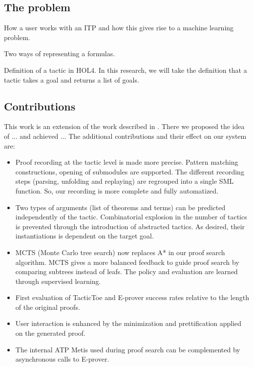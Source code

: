 \documentclass[runningheads,a4paper,draft]{svjour3}
\newcommand{\todoi}[1]{\todo[inline]{#1}}
\def\holfour{\textsf{HOL4}\xspace}
\def\eprover{\textsf{E-prover}\xspace}
\def\sml{\textsf{SML}\xspace}
\def\metis{\textsf{Metis}\xspace}
\def\tactictoe{\textsf{TacticToe}\xspace}
\begin{document}
\subsection{The problem}\todo{}

How a user works with an ITP and how this gives rise to a machine learning problem.

Two ways of representing a formulas.

Definition of a tactic in \holfour. In this research, we will take the definition
that a tactic takes a goal and returns a list of goals.



\subsection{Contributions}
This work is an extension of the work described in \cite{tgckju-lpar17}.
There we proposed the idea of ... and achieved ...
The additional contributions and their effect on our system are:

\todoi{add prediction of 4 kinds of things}
\begin{itemize}
\item Proof recording at the tactic level is made more precise. Pattern 
matching constructions, opening of submodules are supported. The different 
recording steps (parsing, unfolding and replaying) are regrouped into a single 
\sml function. So, our recording is more complete and fully automatized.
\item Two types of arguments (list of theorems and terms) can be predicted 
independently of the tactic. Combinatorial explosion in the number of tactics 
is prevented through the introduction of abstracted tactics. As desired, their 
instantiations is dependent on the target goal.
\item MCTS (Monte Carlo tree search) now replaces A* in our proof search 
algorithm. MCTS gives a more balanced feedback to guide proof search by 
comparing subtrees instead of leafs. The policy and evaluation are learned 
through supervised learning.

\item First evaluation of \tactictoe and \eprover success rates relative to 
the length of the original proofs.
\item User interaction is enhanced by the minimization and prettification 
applied on the generated proof.
\item The internal ATP \metis used during proof search can be complemented 
by asynchronous calls to \eprover.
\end{itemize}
\end{document}
